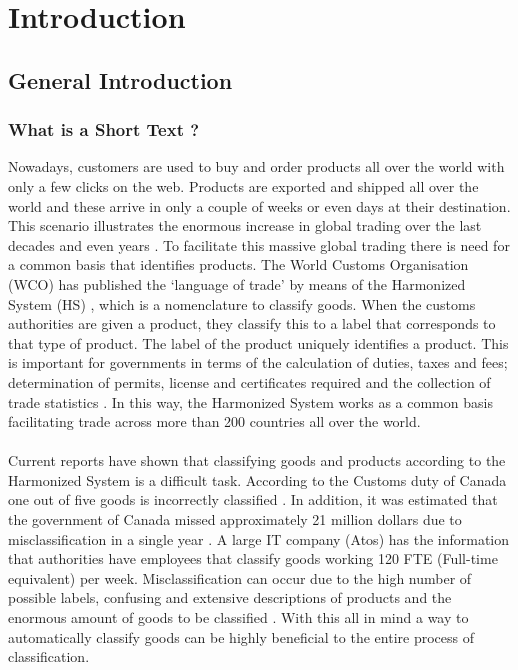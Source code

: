 \chapter{Introduction}\label{ch:intro}
\section{General Introduction}
\subsection{What is a Short Text ?}

Nowadays, customers are used to buy and order products all over the world with only a few clicks on the web. Products are exported and shipped all over the world and these arrive in only a couple of weeks or even days at their destination. This scenario illustrates the enormous increase in global trading over the last decades \cite{EstebanOrtiz-Ospina2018} and even years \cite{WorldTradeOrganization2019World2019}. To facilitate this massive global trading there is need for a common basis that identifies products. The World Customs Organisation (WCO) has published the ‘language of trade’ by means of the Harmonized System (HS) \cite{GeneralSecretariatoftheWorldCustomsOrganisationWCO1983} , which is a nomenclature to classify goods. When the customs authorities are given a product, they classify this to a label that corresponds to that type of product. The label of the product uniquely identifies a product. This is important for governments in terms of the calculation of duties, taxes and fees; determination of permits, license and certificates required and the collection of trade statistics \cite{Ding2015}. In this way, the Harmonized System works as a common basis facilitating trade across more than 200 countries all over the world.\\
\\
Current reports have shown that classifying goods and products according to the Harmonized System is a difficult task. According to the Customs duty of Canada one out of five goods is incorrectly classified \cite{AuditorGeneralofCanada2017}. In addition, it was estimated that the government of Canada missed approximately 21 million dollars due to misclassification in a single year \cite{AuditorGeneralofCanada2017}. A large IT company (Atos) has the information that authorities have employees that classify goods working 120 FTE (Full-time equivalent) per week. Misclassification can occur due to the high number of possible labels, confusing and extensive descriptions of products and the enormous amount of goods to be classified \cite{Kappler2011a}. With this all in mind a way to automatically classify goods can be highly beneficial to the entire process of classification.\\
